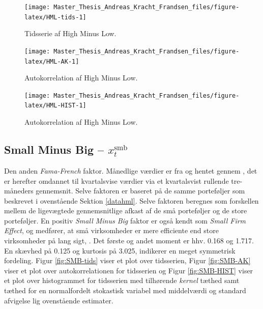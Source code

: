 \documentclass[
  a4paper,
  oneside]{memoir}
\begin{document}
\begin{figure}[htbp!]

{\centering \texttt{[image: Master\_Thesis\_Andreas\_Kracht\_Frandsen\_files/figure-latex/HML-tids-1]} 

}

\caption{Tidsserie af High Minus Low.}\label{fig:HML-tids}
\end{figure}

\begin{figure}[htbp!]

{\centering \texttt{[image: Master\_Thesis\_Andreas\_Kracht\_Frandsen\_files/figure-latex/HML-AK-1]} 

}

\caption{Autokorrelation af High Minus Low.}\label{fig:HML-AK}
\end{figure}

\begin{figure}[htbp!]

{\centering \texttt{[image: Master\_Thesis\_Andreas\_Kracht\_Frandsen\_files/figure-latex/HML-HIST-1]} 

}

\caption{Autokorrelation af High Minus Low.}\label{fig:HML-HIST}
\end{figure}

\hypertarget{datasmb}{%
\subsection{\texorpdfstring{Small Minus Big -- \(x_t^{\text{smb}}\)}{Small Minus Big -- x\_t\^{}\{\textbackslash text\{smb\}\}}}\label{datasmb}}

Den anden \emph{Fama-French} faktor. Månedlige værdier er fra \citep{CRSPakt} og hentet gennem \citep{French2020}, det er herefter omdannet til kvartalsvise værdier via et kvartalsvist rullende tre-måneders gennemsnit. Selve faktoren er baseret på de samme porteføljer som beskrevet i ovenstående Sektion \ref{datahml}. Selve faktoren beregnes som forskellen mellem de ligevægtede gennemsnitlige afkast af de små porteføljer og de store porteføljer. En positiv \emph{Small Minus Big} faktor er også kendt som \emph{Small Firm Effect}, og medfører, at små virksomheder er mere efficiente end store virksomheder på lang sigt, \citep{French1993}. Det første og andet moment er hhv. 0.168 og 1.717. En skævhed på 0.125 og kurtosis på 3.025, indikerer en meget symmetrisk fordeling. Figur \ref{fig:SMB-tids} viser et plot over tidsserien, Figur \ref{fig:SMB-AK} viser et plot over autokorrelationen for tidsserien og Figur \ref{fig:SMB-HIST} viser et plot over histogrammet for tidsserien med tilhørende \emph{kernel} tæthed samt tæthed for en normalfordelt stokastisk variabel med middelværdi og standard afvigelse lig ovenstående estimater.
\end{document}
